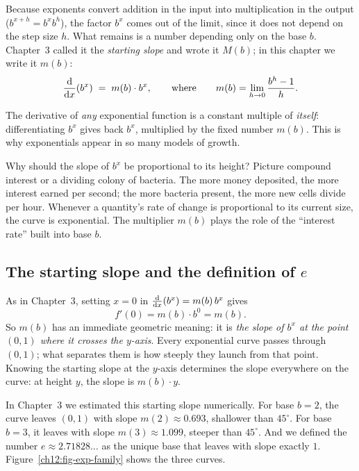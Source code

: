 Because exponents convert addition in the input into multiplication in the
output ($b^{x+h} = b^x b^h$), the factor $b^x$ comes out of the limit,
since it does not depend on the step size $h$. What remains is a number
depending only on the base $b$. Chapter~3 called it the \emph{starting slope}
and wrote it $M(b)$; in this chapter we write it $m(b)$:
\[
   \frac{\mathrm{d}}{\mathrm{d} x}\!\left(b^x\right) \;=\; m(b)\cdot b^x,
   \qquad\text{where}\qquad
   m(b) = \lim_{h \to 0}\frac{b^h - 1}{h}.
\]

\begin{focusbox}
The derivative of \emph{any} exponential function is a constant multiple of
\emph{itself}: differentiating $b^x$ gives back $b^x$, multiplied by the fixed
number $m(b)$. This is why exponentials appear in so many models of growth.
\end{focusbox}

\begin{intuitionbox}
Why should the slope of $b^x$ be proportional to its height? Picture compound
interest or a dividing colony of bacteria. The more money deposited, the more
interest earned per second; the more bacteria present, the more new cells
divide per hour. Whenever a quantity's rate of change is proportional to its
current size, the curve is exponential. The multiplier $m(b)$ plays the role
of the ``interest rate'' built into base $b$.
\end{intuitionbox}

\subsection{The starting slope and the definition of $e$}

As in Chapter~3, setting $x = 0$ in $\frac{\mathrm{d}}{\mathrm{d} x}\!\left(b^x\right) = m(b)\,b^x$ gives
\[
   f'(0) = m(b)\cdot b^0 = m(b).
\]
So $m(b)$ has an immediate geometric meaning: it is \emph{the slope of $b^x$ at
the point $(0,1)$ where it crosses the $y$-axis}. Every exponential curve passes
through $(0,1)$; what separates them is how steeply they launch from that point.
Knowing the starting slope at the $y$-axis determines the slope everywhere on
the curve: at height $y$, the slope is $m(b)\cdot y$.

In Chapter~3 we estimated this starting slope numerically. For base $b = 2$,
the curve leaves $(0,1)$ with slope $m(2) \approx 0.693$, shallower than
$45^\circ$. For base $b = 3$, it leaves with slope $m(3) \approx 1.099$,
steeper than $45^\circ$. And we defined the number $e \approx 2.71828\dots$
as the unique base that leaves with slope exactly $1$.
Figure~\ref{ch12:fig-exp-family} shows the three curves.

